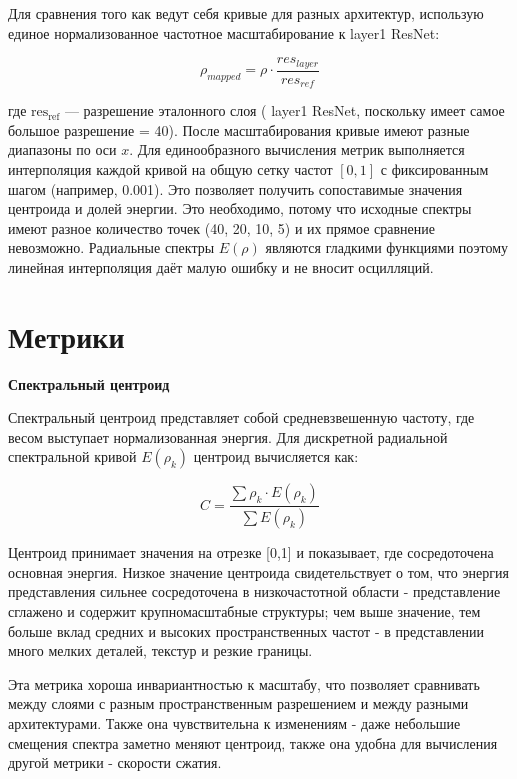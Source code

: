 Для сравнения того как ведут себя кривые для разных архитектур, использую единое нормализованное частотное масштабирование к layer1 ResNet:

\begin{equation}
    \rho_{mapped} = \rho \cdot \frac{res_{layer}}{res_{ref}}  
\end{equation}

где $\text{res}_\text{ref}$ — разрешение эталонного слоя ( layer1 ResNet, поскольку имеет самое большое разрешение = 40). После масштабирования кривые имеют разные диапазоны по оси $x$. Для единообразного вычисления метрик выполняется интерполяция каждой кривой на общую сетку частот $[0, 1]$ с фиксированным шагом (например, 0.001). Это позволяет получить сопоставимые значения центроида и долей энергии. Это необходимо, потому что исходные спектры имеют разное количество точек (40, 20, 10, 5) и их прямое сравнение невозможно. Радиальные спектры $E(\rho)$ являются гладкими функциями поэтому линейная интерполяция даёт малую ошибку и не вносит осцилляций.
 
\section{Метрики}

\textbf{Спектральный центроид}

Спектральный центроид представляет собой средневзвешенную частоту, где весом выступает нормализованная энергия. Для дискретной радиальной спектральной кривой $E(\rho_k)$ центроид вычисляется как:

\begin{equation}
    C = \frac{\sum \rho_k \cdot E(\rho_k)}{\sum E(\rho_k)}
\end{equation}

Центроид принимает значения на отрезке [0,1] и показывает, где сосредоточена основная энергия. Низкое значение центроида свидетельствует о том, что энергия представления сильнее сосредоточена в низкочастотной области - представление сглажено и содержит крупномасштабные структуры; чем выше значение, тем больше вклад средних и высоких пространственных частот - в представлении много мелких деталей, текстур и резкие границы.

Эта метрика хороша инвариантностью к масштабу, что позволяет сравнивать между слоями с разным пространственным разрешением и между разными архитектурами. Также она чувствительна к изменениям - даже небольшие смещения спектра заметно меняют центроид, также она удобна для вычисления другой метрики - скорости сжатия.

